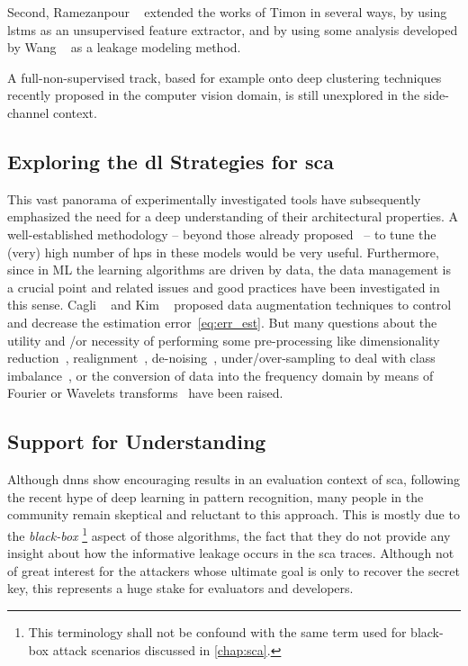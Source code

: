 Second, Ramezanpour \etal{}~\cite{ramezanpour_scaul_2020} extended the works of Timon in several ways, by using \glspl{lstm} as an unsupervised feature extractor, and by using some analysis developed by Wang \etal{}~\cite{wang_ridge_2018} as a leakage modeling method.

A full-non-supervised track, based for example onto deep clustering techniques recently proposed in the computer vision domain, is still unexplored in the side-channel context.

\subsection{Exploring the \gls{dl} Strategies for \gls{sca}}
This vast panorama of experimentally investigated tools have subsequently emphasized the need for a deep understanding of their architectural properties.  
A well-established methodology -- beyond those already proposed~\cite{prouff_study_2018,zaid_methodology_2019} -- to tune the (very) high number of \glspl{hp} in these models would be very useful.
Furthermore, since in ML the learning algorithms are driven by data, the data management is a crucial point and related issues and good practices have been investigated in this sense.
Cagli \etal{}~\cite{cagli_convolutional_2017} and Kim \etal{}~\cite{kim_make_2019} proposed data augmentation techniques to control and decrease the estimation error~\eqref{eq:err_est}.
But many questions about the utility and /or necessity of performing some pre-processing like dimensionality reduction~\cite{maghrebi_deep_2019}, realignment~\cite{cagli_convolutional_2017,zhou_deep_2019}, de-noising~\cite{wu_remove_2019}, under/over-sampling to deal with class imbalance~\cite{picek_curse_2019}, or the conversion of data into the frequency domain by means of Fourier or Wavelets transforms~\cite{yang_convolutional_2018,destouet_wavelet_2020} have been raised.

\subsection{Support for Understanding}
Although \glspl{dnn} show encouraging results in an evaluation context of \gls{sca}, following the recent hype of deep learning in pattern recognition, many people in the community remain skeptical and reluctant to this approach.
This is mostly due to the \emph{black-box}%
\footnote{
    This terminology shall not be confound with the same term used for black-box attack scenarios discussed in \autoref{chap:sca}.
} 
aspect of those algorithms, \ie{} the fact that they do not provide any insight about how the informative leakage occurs in the \gls{sca} traces.
Although not of great interest for the attackers whose ultimate goal is only to recover the secret key, this represents a huge stake for evaluators and developers.

